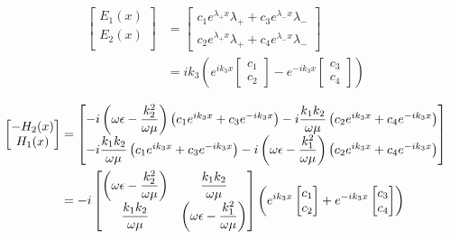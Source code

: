 \begin{align}
    \begin{bmatrix}
        E_1(x)\\
        E_2(x)\\
    \end{bmatrix}
    &=
    \begin{bmatrix}
        c_1 e^{\lambda_+ x} \lambda_{+} + c_3 e^{\lambda_- x} \lambda_{-} \\
        c_2 e^{\lambda_+ x} \lambda_{+} + c_4 e^{\lambda_- x} \lambda_{-}
    \end{bmatrix}\\
    &=ik_3\left( e^{ik_3 x}
    \begin{bmatrix}
        c_1 \\
        c_2
    \end{bmatrix}
    -e^{-ik_3 x}
    \begin{bmatrix}
        c_3 \\
        c_4
    \end{bmatrix}
    \right)
    \label{eq:imp_fourier:plan:generale_E}
\end{align}

\begin{align}
    \begin{bmatrix}
        -H_2(x)\\
        H_1(x)\\
    \end{bmatrix}
    &=
    \begin{bmatrix}
        -i\left(\omega\epsilon - \dfrac{k_2^2}{\omega\mu}\right) \left( c_1 e^{ik_3 x} + c_3 e^{-ik_3 x} \right) - i\dfrac{k_1k_2}{\omega\mu} \left( c_2 e^{ik_3 x} + c_4 e^{-ik_3 x} \right)
        \\
        -i\dfrac{k_1k_2}{\omega\mu} \left( c_1 e^{ik_3 x} + c_3 e^{-ik_3 x} \right) - i\left(\omega\epsilon - \dfrac{k_1^2}{\omega\mu}\right)\left( c_2 e^{ik_3 x} + c_4 e^{-ik_3 x} \right)
    \end{bmatrix} \\
    &=-i
    \begin{bmatrix}
    \left(\omega\epsilon - \dfrac{k_2^2}{\omega\mu}\right) & \dfrac{k_1k_2}{\omega\mu}
    \\
    \dfrac{k_1k_2}{\omega\mu} & \left(\omega\epsilon - \dfrac{k_1^2}{\omega\mu}\right) 
    \end{bmatrix}
    \left(
        e^{ik_3 x}
        \begin{bmatrix}
            c_1 \\
            c_2
        \end{bmatrix}
        +e^{-ik_3 x}
        \begin{bmatrix}
            c_3 \\
            c_4
        \end{bmatrix}
    \right)
    \label{eq:imp_fourier:plan:generale_H}
\end{align}

